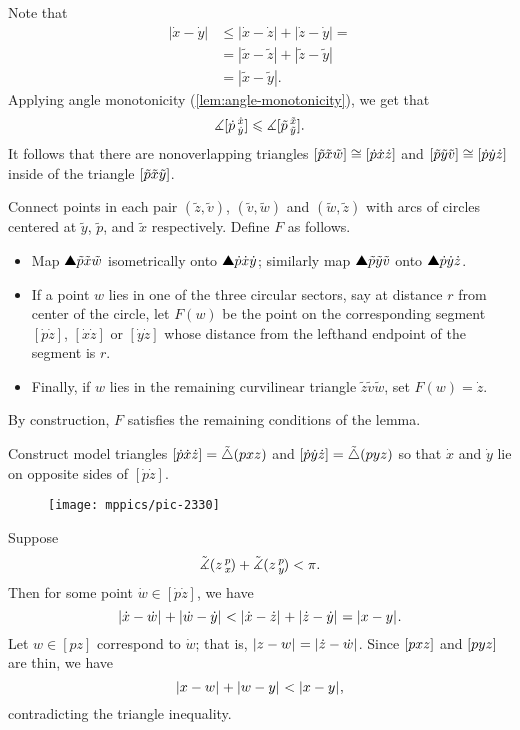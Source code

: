 Note that 
\begin{align*}
|\dot x-\dot y|&\le |\dot x-\dot z|+|\dot z-\dot y|=
\\
&=|\tilde  x-\tilde  z|+|\tilde  z-\tilde  y|
\\
&=|\tilde  x-\tilde  y|.
\end{align*}
Applying angle monotonicity (\ref{lem:angle-monotonicity}), we get that
\[\measuredangle[\dot p\,{}^{\dot x}_{\dot y}]\leqslant \measuredangle[\tilde  p\,{}^{\tilde  x}_{\tilde  y}].\]
It follows that there are nonoverlapping triangles 
$[\tilde p{\tilde x}{\tilde w}]\cong[\dot p{\dot x}{\dot z}]$ 
and 
$[\tilde p{\tilde y}{\tilde v}]\cong[\dot p{\dot y}{\dot z}]$
 inside of the triangle $[\tilde p{\tilde x}{\tilde y}]$.


Connect points in each pair
$(\tilde z,\tilde v)$, 
$(\tilde v,\tilde w)$ 
and $(\tilde w,\tilde z)$ 
with arcs of circles centered at 
$\tilde y$, $\tilde p$, and $\tilde x$ respectively. 
Define $F$ as follows.
\begin{itemize}
\item Map  $\solidtriangle{\tilde p}{\tilde x}{\tilde w}$ isometrically onto  $\solidtriangle {\dot p}{\dot x}{\dot y}$;
similarly map $\solidtriangle{\tilde p}{\tilde y}{\tilde v}$ onto $\solidtriangle {\dot p}{\dot y}{\dot z}$.
\item If a point $w$ lies in one of the three circular sectors, say at distance $r$ from center of the circle, let $F(w)$ be the point on the corresponding segment 
$[\dot p \dot z]$, 
$[\dot x \dot z]$ 
or $[\dot y \dot z]$ whose distance from the lefthand endpoint of the segment is $r$.
\item Finally, if $w$ lies in the remaining curvilinear triangle $\tilde z \tilde v \tilde w$, 
set $F(w) =\dot z$. 
\end{itemize}
By construction, $F$ satisfies the remaining conditions of the lemma. 
\qeds


Construct model triangles $\trig{\dot p}{\dot x}{\dot z}\z=\modtrig(p x z)$ 
and $[\dot p{\dot y}{\dot z}]=\tilde\triangle(p y z)$ so that $\dot x$ and $\dot y$ lie on opposite sides of $[\dot p\dot z]$.

\begin{wrapfigure}{r}{30 mm}
\vskip-0mm
\centering
\texttt{[image: mppics/pic-2330]}
\end{wrapfigure}

Suppose
\[\tilde\measuredangle(z\,{}^{p}_{x}\hspace{-0.2ex})+\tilde\measuredangle(z\,{}^{p}_{y}\hspace{-0.2ex})
<
\pi.\]
Then for some point $\dot w\in[\dot p\dot z]$, we have \[\dist{\dot x}{\dot w}{}+\dist{\dot w}{\dot y}{}
<
\dist{\dot x}{\dot z}{}+\dist{\dot z}{\dot y}{}=\dist{x}{y}{}.\]
Let $w\in[p z]$ correspond to $\dot w$; that is, $\dist{z}{w}{}=\dist{\dot z}{\dot w}{}$. 
Since $[p{x}{z}]$ and $[p{y}{z}]$ are thin, we have 
\[\dist{x}{w}{}+\dist{w}{y}{}<\dist{x}{y}{},\]
contradicting the triangle inequality. 

